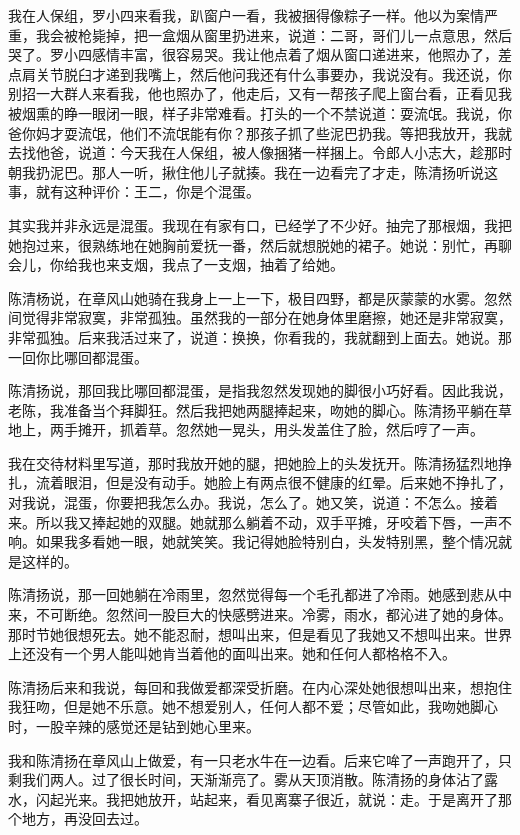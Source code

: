  我在人保组，罗小四来看我，趴窗户一看，我被捆得像粽子一样。他以为案情严重，我会被枪毙掉，把一盒烟从窗里扔进来，说道：二哥，哥们儿一点意思，然后哭了。罗小四感情丰富，很容易哭。我让他点着了烟从窗口递进来，他照办了，差点肩关节脱臼才递到我嘴上，然后他问我还有什么事要办，我说没有。我还说，你别招一大群人来看我，他也照办了，他走后，又有一帮孩子爬上窗台看，正看见我被烟熏的睁一眼闭一眼，样子非常难看。打头的一个不禁说道：耍流氓。我说，你爸你妈才耍流氓，他们不流氓能有你？那孩子抓了些泥巴扔我。等把我放开，我就去找他爸，说道：今天我在人保组，被人像捆猪一样捆上。令郎人小志大，趁那时朝我扔泥巴。那人一听，揪住他儿子就揍。我在一边看完了才走，陈清扬听说这事，就有这种评价：王二，你是个混蛋。 
 
 其实我并非永远是混蛋。我现在有家有口，已经学了不少好。抽完了那根烟，我把她抱过来，很熟练地在她胸前爱抚一番，然后就想脱她的裙子。她说：别忙，再聊会儿，你给我也来支烟，我点了一支烟，抽着了给她。 
 
 陈清杨说，在章风山她骑在我身上一上一下，极目四野，都是灰蒙蒙的水雾。忽然间觉得非常寂寞，非常孤独。虽然我的一部分在她身体里磨擦，她还是非常寂寞，非常孤独。后来我活过来了，说道：换换，你看我的，我就翻到上面去。她说。那一回你比哪回都混蛋。 
 
 陈清扬说，那回我比哪回都混蛋，是指我忽然发现她的脚很小巧好看。因此我说，老陈，我准备当个拜脚狂。然后我把她两腿捧起来，吻她的脚心。陈清扬平躺在草地上，两手摊开，抓着草。忽然她一晃头，用头发盖住了脸，然后哼了一声。 
 
 我在交待材料里写道，那时我放开她的腿，把她脸上的头发抚开。陈清扬猛烈地挣扎，流着眼泪，但是没有动手。她脸上有两点很不健康的红晕。后来她不挣扎了，对我说，混蛋，你要把我怎么办。我说，怎么了。她又笑，说道：不怎么。接着来。所以我又捧起她的双腿。她就那么躺着不动，双手平摊，牙咬着下唇，一声不响。如果我多看她一眼，她就笑笑。我记得她脸特别白，头发特别黑，整个情况就是这样的。 
 
 陈清扬说，那一回她躺在冷雨里，忽然觉得每一个毛孔都进了冷雨。她感到悲从中来，不可断绝。忽然间一股巨大的快感劈进来。冷雾，雨水，都沁进了她的身体。那时节她很想死去。她不能忍耐，想叫出来，但是看见了我她又不想叫出来。世界上还没有一个男人能叫她肯当着他的面叫出来。她和任何人都格格不入。 
 
 陈清扬后来和我说，每回和我做爱都深受折磨。在内心深处她很想叫出来，想抱住我狂吻，但是她不乐意。她不想爱别人，任何人都不爱；尽管如此，我吻她脚心时，一股辛辣的感觉还是钻到她心里来。 
 
 我和陈清扬在章风山上做爱，有一只老水牛在一边看。后来它哞了一声跑开了，只剩我们两人。过了很长时间，天渐渐亮了。雾从天顶消散。陈清扬的身体沾了露水，闪起光来。我把她放开，站起来，看见离寨子很近，就说：走。于是离开了那个地方，再没回去过。 
 
